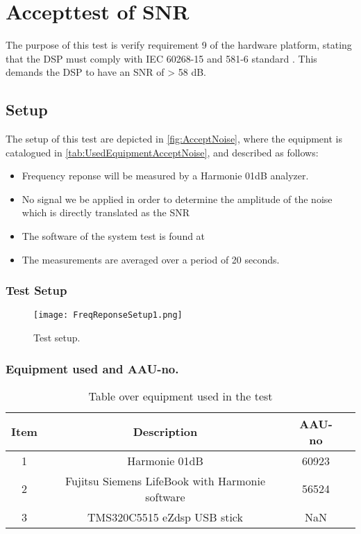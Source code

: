 \chapter{Accepttest of SNR}\label{app:journal_Frequency_Response_Noise}
The purpose of this test is verify requirement 9 of the hardware platform, stating that the DSP must comply with IEC 60268-15 and 581-6 standard \citep{IEC60268}. This demands the DSP to have an SNR of > 58 dB. 

\section{Setup}
The setup of this test are depicted in \autoref{fig:AcceptNoise}, where the equipment is catalogued in \autoref{tab:UsedEquipmentAcceptNoise}, and described as follows:

\begin{itemize}
\item Frequency reponse will be measured by a Harmonie 01dB analyzer.
\item No signal we be applied in order to determine the amplitude of the noise which is directly translated as the SNR
\item The software of the system test is found at 
\item The measurements are averaged over a period of 20 seconds.
\end{itemize}


\subsection*{Test Setup}
\begin{figure}[H]
\centering
\texttt{[image: FreqReponseSetup1.png]}
\caption{Test setup.}
\label{fig:AcceptNoise}
\end{figure}

\subsection*{Equipment used and AAU-no.}

\begin{table}[H]
\centering
{}
\begin{tabular}{S[table-format=1]ccc} \toprule
    {Item} & {Description} & {AAU-no} \\       &  Harmonie 01dB  & 60923  \\ 
    2      &  Fujitsu Siemens LifeBook with Harmonie software  & 56524  \\ 
    3      &  TMS320C5515 eZdsp USB stick  & NaN  \\  \bottomrule 
\end{tabular}
\caption{Table over equipment used in the test}
\label{tab:UsedEquipmentAcceptNoise}
\end{table}
\vspace{-5mm}



